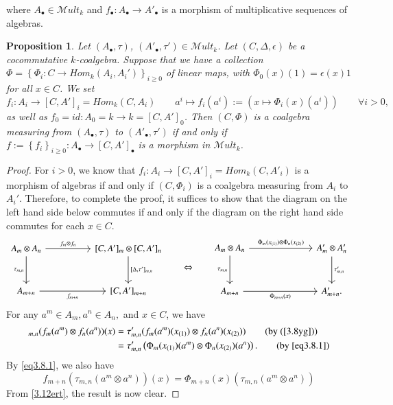 \documentclass[10pt, colorlinks]{article}
\numberwithin{equation}{section} \DeclareMathSizes{2}{10}{12}{13}
\newtheorem{thm}{Proposition}[section]
\begin{document}
    where $A_\bullet\in \mathscr{M}ult_k$ and $f_\bullet:A_\bullet\longrightarrow A'_\bullet$ is a morphism of multiplicative sequences of algebras.
    \fi
   \begin{thm}\label{prop3.3}
        Let $(A_\bullet,\tau)$, $(A'_\bullet,\tau')\in \mathscr Mult_k$. Let $(C,\Delta,\epsilon)$ be a cocommutative $k$-coalgebra. Suppose that we have a collection $\Phi=\left\{\Phi_i:C\longrightarrow  {Hom}_k(A_i,A_i')\right\}_{i\geq 0}$   of linear maps, with $\Phi_0(x)(1)=\epsilon(x)1$ for all $x\in C$. We set
        \begin{equation}\label{eq3.8.1}
    f_i:A_i\longrightarrow [C,A']_i=Hom_k(C,A_i)\qquad a^i\longmapsto f_i(a^i):=(x\mapsto \Phi_i(x)(a^i))\qquad \forall i> 0,
    \end{equation}
    as well as  $f_0=id:A_0=k\longrightarrow   k=[C,A']_0$. Then $(C,\Phi)$ is a coalgebra measuring from $(A_\bullet,\tau)$ to $(A'_\bullet,\tau')$ if and only if $f:=\left\{f_i\right\}_{i\geq0}: A_\bullet\longrightarrow  [C, A']_\bullet$ is a morphism in $ \mathscr Mult_k$. 
    \end{thm}
    \begin{proof}
   For $i>0$, we know that $f_i:A_i\longrightarrow [C,A']_i=Hom_k(C,A'_i)$ is a morphism of algebras if and only if $(C,\Phi_i)$ is a coalgebra measuring from $A_i$ to $A_i'$. Therefore, to complete the proof, it suffices to show that the diagram on the left hand side below commutes if and only if the diagram on the right hand side commutes for each $x\in C$.
        \begin{equation}\label{3.12ert}
            \begin{tikzcd}[row sep=3em,column sep=5em]
   A_m \otimes A_n\arrow[r, "f_m \otimes f_{n}"]\arrow[d, "\tau_{m,n}"']
   & {[C,A']_{m}} \otimes  {[C,A']_n}
  \arrow[d,  "{[\Delta,\tau']_{m,n}}",right]\\
  A_{m+n}\arrow[r, "f_{m+n}"']
  & {[C,A']}_{m+n}
         \end{tikzcd}
        \qquad \textit{$\Leftrightarrow$}\qquad
    \begin{tikzcd}[ row sep=3em,column sep=7em]
A_m \otimes A_n
  \arrow[r, "\Phi_m(x_{(1)}) \otimes \Phi_{n}(x_{(2)})"]
  \arrow[d, "\tau_{m,n}"']
&
A'_{m} \otimes A'_n
  \arrow[d, "\tau'_{m,n}"]
\\
A_{m+n}
  \arrow[r, "\Phi_{m+n}(x)"']
&
A'_{m+n}.
\end{tikzcd}
\end{equation}
For any $a^m\in A_m,a^n\in A_n,$ and $x\in C$, we have
\begin{align*}
    [\Delta,\tau']_{m,n} (f_m(a^m)\otimes f_n(a^n))(x) &= \tau'_{m,n}(f_m(a^m)(x_{(1)}) \otimes f_n(a^n)(x_{(2)}))\tag{by (\ref{3.8yg})}\\
    &=\tau'_{m,n}  \left(\Phi_m(x_{(1)})(a^m)\otimes\Phi_n(x_{(2)})(a^n)\right).\tag{by \eqref{eq3.8.1}}
\end{align*} By \eqref{eq3.8.1}, we also have
\begin{equation}
f_{m+n}(\tau_{m,n}(a^m\otimes a^n))(x)=\Phi_{m+n}(x)(\tau_{m,n}(a^m\otimes a^n))
\end{equation} From \eqref{3.12ert}, the result is now clear. 
 
    \end{proof}
\end{document}
